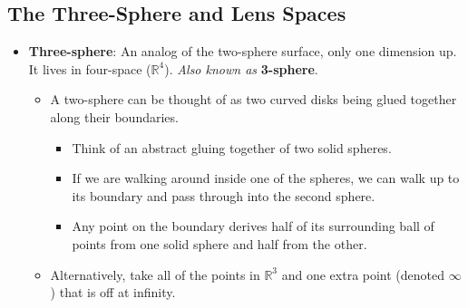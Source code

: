 \documentclass[titlepage]{article}
\numberwithin{figure}{section}
\numberwithin{table}{section}
\numberwithin{equation}{section}
\begin{document}
\subsection{The Three-Sphere and Lens Spaces}
\begin{itemize}
    \item \textbf{Three-sphere}: An analog of the two-sphere surface, only one dimension up. It lives in four-space ($\mathbb{R}^4$). \emph{Also known as} \textbf{3-sphere}.
    \begin{itemize}
        \item A two-sphere can be thought of as two curved disks being glued together along their boundaries.
        \begin{itemize}
            \item Think of an abstract gluing together of two solid spheres.
            \item If we are walking around inside one of the spheres, we can walk up to its boundary and pass through into the second sphere.
            \item Any point on the boundary derives half of its surrounding ball of points from one solid sphere and half from the other.
        \end{itemize}
        \item Alternatively, take all of the points in $\mathbb{R}^3$ and one extra point (denoted $\infty$) that is off at infinity.
        \begin{figure}[h!]
            \centering
\end{figure}
\end{itemize}
\end{itemize}
\end{document}
